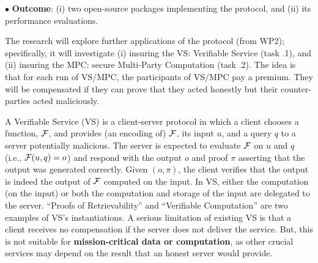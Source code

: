  \noindent$\bullet$\textbf{ Outcome}:  (i)  two open-source packages implementing the protocol, and (ii) its performance evaluations. %
 
 
\vs
\noindent{}

\vs

 The research will explore further applications of the protocol (from WP2); specifically, it will investigate (i) insuring the VS: Verifiable Service (task \4.1), and (ii) insuring the MPC: secure Multi-Party Computation (task \4.2). The idea is that for each run of VS/MPC, the participants of  VS/MPC pay a premium. They will be compensated if they can prove that they acted honestly but their counter-parties acted maliciously. 
 
 
A Verifiable Service (VS) is a client-server protocol in which a client chooses a function, $\mathcal{F}$,
and provides (an encoding of) $\mathcal{F}$, its input $u$, and a query $q$ to a server potentially malicious. The server is expected to evaluate
$\mathcal{F}$ on $u$ and $q$ (i.e., $\mathcal{F}(u, q)=o$) and respond with the output $o$ and proof $\pi$ asserting that the output was generated correctly. Given $(o, \pi)$, the client verifies that the output is indeed the output of $\mathcal{F}$ computed on the input. In VS, either the
computation (on the input) or both the computation and storage of the input are delegated to the server. ``Proofs of Retrievability''  and  ``Verifiable Computation'' are two examples of VS's instantiations. A serious limitation of existing VS is that a client receives no compensation if the server does not deliver the service. But, this is not suitable for \textbf{mission-critical data or computation}, as other crucial services may depend on the result that an honest server would provide. 

